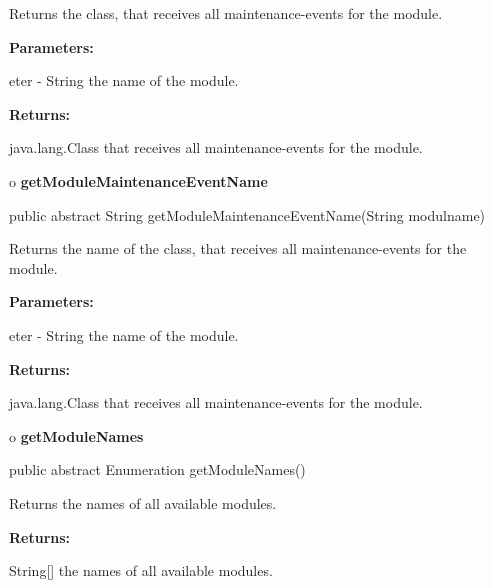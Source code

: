 \begin{description}
\htmlDD Returns the class, that receives all maintenance-events for the
module. 

\begin{description}
\item {\bf Parameters:}  

eter - String the name of the module.  
\item {\bf Returns:}  

java.lang.Class that receives all maintenance-events for the module.  
\end{description}

\end{description}

o {\bf getModuleMaintenanceEventName} 

\begin{PRE}
 public abstract String getModuleMaintenanceEventName(String modulname)
\end{PRE}

\begin{description}
\htmlDD Returns the name of the class, that receives all maintenance-events
for the module. 

\begin{description}
\item {\bf Parameters:}  

eter - String the name of the module.  
\item {\bf Returns:}  

java.lang.Class that receives all maintenance-events for the module.  
\end{description}

\end{description}

o {\bf getModuleNames} 

\begin{PRE}
 public abstract Enumeration getModuleNames()
\end{PRE}

\begin{description}
\htmlDD Returns the names of all available modules. 

\begin{description}
\item {\bf Returns:}  

String[] the names of all available modules.  
\end{description}

\end{description}

